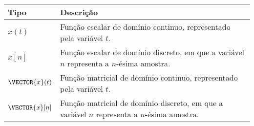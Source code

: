 \begin{notation}~\\
\begin{tabular}{p{} | p{} }
\hline	
\textbf{Tipo}            & \textbf{Descrição} \\ \hline
$x(t)$          & Função escalar de domínio continuo, representado pela variável $t$. \\ \hline
$x[n]$          & Função escalar de domínio discreto, em que a variável $n$ representa a $n$-ésima amostra. \\ \hline
$\VECTOR{x}(t)$ & Função matricial de domínio continuo, representado pela variável $t$.  \\ \hline
$\VECTOR{x}[n]$ & Função matricial de domínio discreto, em que a variável $n$ representa a $n$-ésima amostra. \\
\hline
\end{tabular}
\end{notation}

